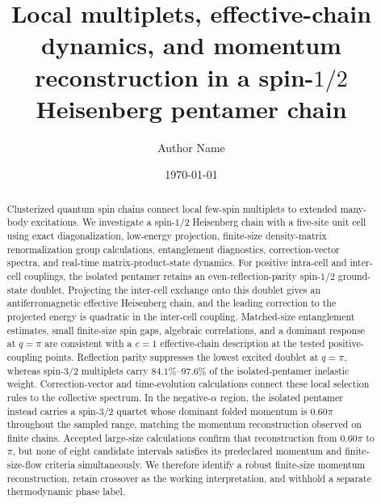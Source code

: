 \documentclass[
  aps,
  prb,
  reprint,
  amsmath,
  amssymb,
  superscriptaddress,
  longbibliography,
  nofootinbib,
  floatfix,
  showkeys
]{revtex4-2}
\begin{document}
\title{Local multiplets, effective-chain dynamics, and momentum reconstruction in a spin-\texorpdfstring{$1/2$}{1/2} Heisenberg pentamer chain}

\author{Author Name}

\date{\today}

\begin{abstract}
Clusterized quantum spin chains connect local few-spin multiplets to extended many-body excitations.
We investigate a spin-$1/2$ Heisenberg chain with a five-site unit cell using exact diagonalization, low-energy projection, finite-size density-matrix renormalization group calculations, entanglement diagnostics, correction-vector spectra, and real-time matrix-product-state dynamics.
For positive intra-cell and inter-cell couplings, the isolated pentamer retains an even-reflection-parity spin-$1/2$ ground-state doublet.
Projecting the inter-cell exchange onto this doublet gives an antiferromagnetic effective Heisenberg chain, and the leading correction to the projected energy is quadratic in the inter-cell coupling.
Matched-size entanglement estimates, small finite-size spin gaps, algebraic correlations, and a dominant response at $q=\pi$ are consistent with a $c=1$ effective-chain description at the tested positive-coupling points.
Reflection parity suppresses the lowest excited doublet at $q=\pi$, whereas spin-$3/2$ multiplets carry $84.1\%$--$97.6\%$ of the isolated-pentamer inelastic weight.
Correction-vector and time-evolution calculations connect these local selection rules to the collective spectrum.
In the negative-$\alpha$ region, the isolated pentamer instead carries a spin-$3/2$ quartet whose dominant folded momentum is $0.60\pi$ throughout the sampled range, matching the momentum reconstruction observed on finite chains.
Accepted large-size calculations confirm that reconstruction from $0.60\pi$ to $\pi$, but none of eight candidate intervals satisfies its predeclared momentum and finite-size-flow criteria simultaneously.
We therefore identify a robust finite-size momentum reconstruction, retain crossover as the working interpretation, and withhold a separate thermodynamic phase label.
\end{abstract}


\maketitle
\end{document}
